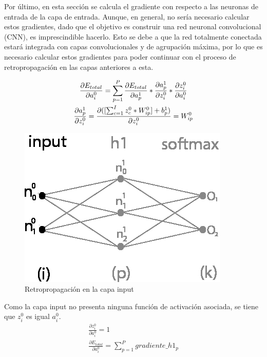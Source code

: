 Por último, en esta sección se calcula el gradiente con respecto a las neuronas de entrada de la capa de entrada. Aunque, en general, no sería necesario calcular estos gradientes, dado que el objetivo es construir una red neuronal convolucional (CNN), es imprescindible hacerlo. Esto se debe a que la red totalmente conectada estará integrada con capas convolucionales y de agrupación máxima, por lo que es necesario calcular estos gradientes para poder continuar con el proceso de retropropagación en las capas anteriores a esta.

\begin{gather}
	\frac{\partial E_{total}}{\partial a^0_i} = \sum_{p=1}^P \frac{\partial E_{total}}{\partial a^1_p} * \frac{\partial a^1_p}{\partial z^0_i} * \frac{\partial z^0_i}{\partial a^0_i} \notag \\
	\frac{\partial a^1_p }{\partial z^0_i } = \frac{\partial ([\sum_{c=1}^{I} z^0_c * W^0_{ip}] + b^1_p) }{\partial z^0_i } = W^0_{ip} \label{grad_a_2}
\end{gather}

\begin{figure}[H]
	\centering
	\includegraphics[scale=0.35]{imagenes/nn_1_capa_input.jpg}  
	\caption{Retropropagación en la capa input}
	\label{fig:nn_1_capa_input}
\end{figure}

Como la capa input no presenta ninguna función de activación asociada, se tiene que $z^0_i$ es igual $a^0_i$. \\

\begin{gather}
	\frac{\partial z^0_i }{\partial a^0_i } = 1 \\
	\frac{\partial E_{total}}{\partial a^0_i} = \sum_{p=1}^{P} gradiente\_h1_p
\end{gather}

